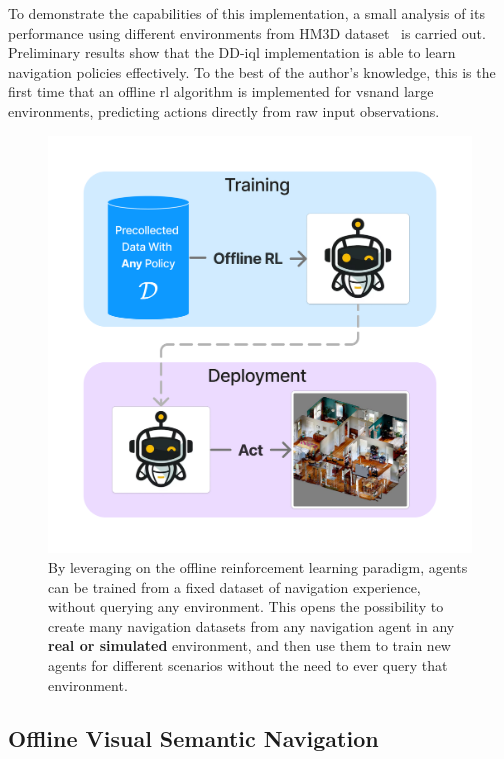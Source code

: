 To demonstrate the capabilities of this implementation, a small analysis of its performance using different environments from HM3D dataset~\cite{Ramakrishnan2021HabitatMatterport3D} is carried out.
Preliminary results show that the DD-\acrshort{iql} implementation is able to learn navigation policies effectively.
To the best of the author's knowledge, this is the first time that an offline \acrshort{rl} algorithm is implemented for \acrshort{vsn}\@ and large environments, predicting actions directly from raw input observations.

\begin{figure}
    \centering
    \includegraphics[width=0.7\linewidth]{figures/offnav/graphical_abstract}
    \caption{
        By leveraging on the offline reinforcement learning paradigm, agents can be trained from a fixed dataset of navigation experience, without querying any environment.
        This opens the possibility to create many navigation datasets from any navigation agent in any \textbf{real or simulated} environment, and then use them to train new agents for different scenarios without the need to ever query that environment.
    }
    \label{fig:abstract_offnav}
\end{figure}

\subsection{Offline Visual Semantic Navigation}\label{subsec:offline-navigation}

